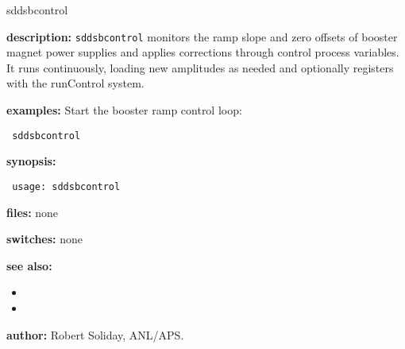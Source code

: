 %
\begin{sddsprog}{sddsbcontrol}
\item \textbf{description:}
\verb+sddsbcontrol+ monitors the ramp slope and zero offsets of booster magnet power supplies and applies corrections through control process variables. It runs continuously, loading new amplitudes as needed and optionally registers with the runControl system.

\item \textbf{examples:}
Start the booster ramp control loop:
\begin{flushleft}{\tt
sddsbcontrol\\
}\end{flushleft}

\item \textbf{synopsis:}
\begin{flushleft}{\tt
usage: sddsbcontrol\\
}\end{flushleft}

\item \textbf{files:} none

\item \textbf{switches:} none

\item \textbf{see also:}
\begin{itemize}
  \item {}
  \item {}
\end{itemize}

\item \textbf{author:} Robert Soliday, ANL/APS.
\end{sddsprog}
